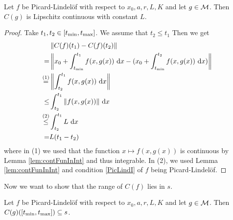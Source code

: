 \begin{lem}\label{lem:lipschitzFun}
Let $f$ be Picard-Lindelöf with respect to $x_0, a, r, L, K$ and let $g \in \mathcal{M}$. 
Then $C(g)$ is Lipschitz continuous with constant $L$. 
\end{lem}

\begin{proof}
Take $t_1, t_2 \in [t_{\text{min}}, t_{\text{max}}]$. We assume that $t_2 \le t_1$
Then we get 
\begin{equation*}
    \begin{split}
        &\left\lVert C(f)(t_1) - C(f)(t_2)\right\rVert \\
        =& \left\lVert x_0 + \int_{t_{\text{min}}}^{t_1} f(x, g(x)) \mathop{}\mathrm{d} x - (x_0 + \int_{t_{\text{min}}}^{t_2} f(x, g(x)) \mathop{}\mathrm{d} x)\right\rVert \\ 
        \stackrel{(1)}{=}& \left\lVert\int_{t_2}^{t_1} f(x, g(x)) \mathop{}\mathrm{d} x\right\rVert \\ 
        \le& \int_{t_2}^{t_1} \left\lVert f(x, g(x))\right\rVert \mathop{}\mathrm{d} x \\ 
        \stackrel{(2)}{\le}& \int_{t_2}^{t_1} L \mathop{}\mathrm{d} x \\ 
        =& L(t_1 - t_2)
    \end{split}
\end{equation*}
where in (1) we used that the function $x \mapsto f(x, g(x))$ is continuous by Lemma \ref{lem:contFunInInt} and thus integrable. 
In (2), we used Lemma \ref{lem:contFunInInt} and condition \ref{PicLindI} of $f$ being Picard-Lindelöf.
\end{proof}

Now we want to show that the range of $C(f)$ lies in $s$. 

\begin{lem}
Let $f$ be Picard-Lindelöf with respect to $x_0, a, r, L, K$ and let $g \in \mathcal{M}$. 
Then $C(g)([t_{\text{min}}, t_{\text{max}}]) \subseteq s$. 
\end{lem}

